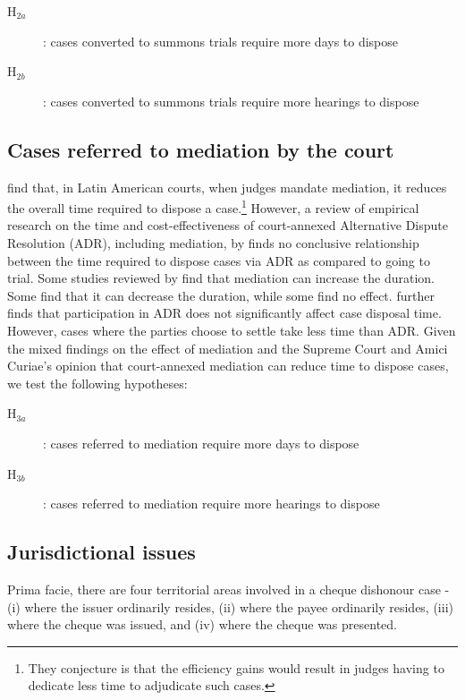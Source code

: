 \begin{enumerate}
\begin{enumerate}
\begin{description}
\item[H$_{2a}$]: cases converted to summons trials require more days to dispose
\item[H$_{2b}$]: cases converted to summons trials require more hearings to dispose
\end{description}

\subsection{Cases referred to mediation by the court} \label{sec:furth-exam-cases}

\textcite{buscaglia1997_latinAmericaCourtDelays} find that, in Latin American courts, when judges mandate mediation, it reduces the overall time required to dispose a case.\footnote{They conjecture is that the efficiency gains would result in judges having to dedicate less time to adjudicate such cases.} However, a review of empirical research on the time and cost-effectiveness of court-annexed Alternative Dispute Resolution (ADR), including mediation, by \textcite{wissler2004effectiveness} finds no conclusive relationship between the time required to dispose cases via ADR as compared to going to trial. Some studies reviewed by \textcite{wissler2004effectiveness} find that mediation can increase the duration. Some find that it can decrease the duration, while some find no effect. \textcite{heise2010adr} further finds that participation in ADR does not significantly affect case disposal time. However, cases where the parties choose to settle take less time than ADR. Given the mixed findings on the effect of mediation and the Supreme Court and Amici Curiae's opinion that court-annexed mediation can reduce time to dispose cases, we test the following hypotheses:

\begin{description}
\item[H$_{3a}$]: cases referred to mediation require more days to dispose
\item[H$_{3b}$]: cases referred to mediation require more hearings to dispose
\end{description}

\subsection{Jurisdictional issues}

Prima facie, there are four territorial areas involved in a cheque dishonour case - (i) where the issuer ordinarily resides, (ii) where the payee ordinarily resides, (iii) where the cheque was issued, and (iv) where the cheque was presented. 


\end{enumerate}
\end{enumerate}
